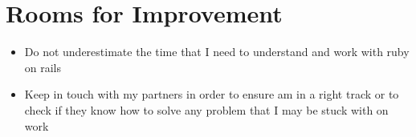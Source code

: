 \section*{Rooms for Improvement}

\begin{itemize}
   \item Do not underestimate the time that I need to understand and work with ruby on rails
   \item Keep in touch with my partners in order to ensure am in a right track or to check if they know how to solve any problem that I may be stuck with on work
\end{itemize}
